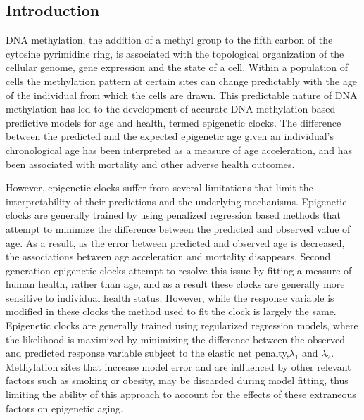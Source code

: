 \documentclass{article}
\begin{document}
{\begin{linenumbers}
\section{Introduction}\label{sec1}

DNA methylation, the addition of a methyl group to the fifth carbon of the cytosine pyrimidine ring,  is associated with 
the topological organization of the cellular genome, gene expression and the state of a cell. Within a population of cells 
the methylation pattern at certain sites can change predictably with the age of the individual from which the cells are 
drawn. This predictable nature of DNA methylation has led to the development of accurate DNA methylation based predictive 
models for age and health, termed epigenetic clocks. The difference between the predicted and the expected epigenetic 
age given an individual’s chronological age has been interpreted as a measure of age acceleration\cite{Horvath2018-ia}, 
and has been associated with mortality\cite{Perna2016-pi,Marioni2015-sn} and other adverse health 
outcomes\cite{Dugue2018-ad,Huang2019-hf,Armstrong2017-vg,Chuang2017-nk,Horvath2015-af}. 

However, epigenetic clocks suffer from several limitations that limit the interpretability of their 
predictions and the underlying mechanisms. Epigenetic clocks are generally trained by using penalized regression based 
methods that attempt to minimize the difference between the predicted and observed value of  age. As a result, as the 
error between predicted and observed age is decreased, the associations between age acceleration and mortality 
disappears\cite{Zhang2019-br}. Second generation epigenetic clocks attempt to resolve this issue by fitting a 
measure of human health, rather than age, and as a result these clocks are generally more sensitive to individual 
health status\cite{Lu2019-lg,Levine2018-en,Belsky2020-ha}. However, while the response variable
is modified in these clocks the method used to fit the clock is largely the same. Epigenetic clocks are generally 
trained using regularized regression models, where the likelihood is maximized by minimizing the difference between 
the observed and predicted response variable subject to the elastic net penalty,$\lambda_1$ and $\lambda_2$. Methylation 
sites that increase model error and are influenced by other relevant factors such as smoking or obesity, may be 
discarded during model fitting, thus limiting the ability of this approach to account for the effects of these 
extraneous factors on epigenetic aging. 


\end{linenumbers}}
\end{document}
